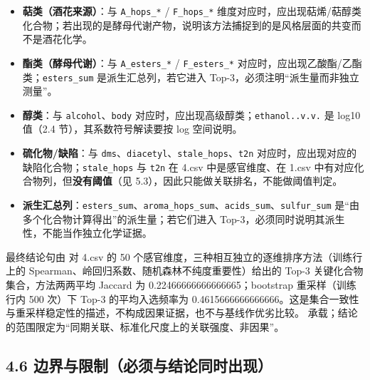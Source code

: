 \documentclass[
  11pt,
]{ctexart}
\providecommand{\tightlist}{%
  \setlength{\itemsep}{0pt}\setlength{\parskip}{0pt}}
\begin{document}
\begin{itemize}
\tightlist
\item
  \textbf{萜类（酒花来源）}：与 \texttt{A\_hops\_*} /
  \texttt{F\_hops\_*}
  维度对应时，应出现萜烯/萜醇类化合物；若出现的是酵母代谢产物，说明该方法捕捉到的是风格层面的共变而不是酒花化学。
\item
  \textbf{酯类（酵母代谢）}：与 \texttt{A\_esters\_*} /
  \texttt{F\_esters\_*}
  对应时，应出现乙酸酯/乙酯类；\texttt{esters\_sum}
  是派生汇总列，若它进入 Top-3，必须注明``派生量而非独立测量''。
\item
  \textbf{醇类}：与 \texttt{alcohol}、\texttt{body}
  对应时，应出现高级醇类；\texttt{ethanol..v.v.} 是 log10 值（2.4
  节），其系数符号解读要按 log 空间说明。
\item
  \textbf{硫化物/缺陷}：与
  \texttt{dms}、\texttt{diacetyl}、\texttt{stale\_hops}、\texttt{t2n}
  对应时，应出现对应的缺陷化合物；\texttt{stale\_hops} 与 \texttt{t2n}
  在 4.csv 中是感官维度、在 1.csv
  中有对应化合物列，但\textbf{没有阈值}（见
  5.3），因此只能做关联排名，不能做阈值判定。
\item
  \textbf{派生汇总列}：\texttt{esters\_sum}、\texttt{aroma\_\allowbreak{}hops\_\allowbreak{}sum}、\texttt{acids\_sum}、\texttt{sulfur\_sum}
  是``由多个化合物计算得出''的派生量；若它们进入
  Top-3，必须同时说明其派生性，不能当作独立化学证据。
\end{itemize}

最终结论句由 对 4.csv 的 50
个感官维度，三种相互独立的逐维排序方法（训练行上的
\textbar Spearman\textbar、岭回归系数、随机森林不纯度重要性）给出的
Top-3 关键化合物集合，方法两两平均 Jaccard 为
0.22466666666666665；bootstrap 重采样（训练行内 500 次）下 Top-3
的平均入选频率为
0.4615666666666666。这是集合一致性与重采样稳定性的描述，不构成因果证据，也不与基线作优劣比较。
承载；结论的范围限定为``同期关联、标准化尺度上的关联强度、非因果''。

\subsection{4.6
边界与限制（必须与结论同时出现）}\label{ux8fb9ux754cux4e0eux9650ux5236ux5fc5ux987bux4e0eux7ed3ux8bbaux540cux65f6ux51faux73b0}
\end{document}
